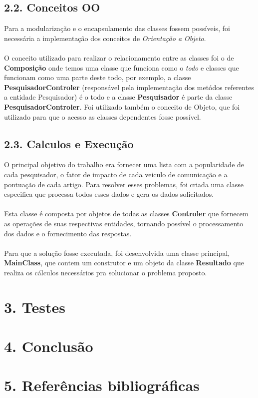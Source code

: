 \documentclass[12pt, a4paper]{article}
\begin{document}
  \subsection*{2.2. Conceitos OO}
    Para a modularização e o encapsulamento das classes fossem possíveis, foi necessária a implementação dos conceitos de \textit{Orientação a Objeto}.\\\\
    O conceito utilizado para realizar o relacionamento entre as classes foi o de \textbf{Composição} onde temos uma classe que funciona como o \textit{todo} e classes que funcionam como uma parte deste todo, por exemplo, a classe \textbf{PesquisadorControler} (responsável pela implementação dos metódos referentes a entidade Pesquisador) é o todo e a classe \textbf{Pesquisador} é parte da classe \textbf{PesquisadorControler}.
    Foi utilizado também o conceito de Objeto, que foi utilizado para que o acesso as classes dependentes fosse possível.

  \subsection*{2.3. Calculos e Execução}
    O principal objetivo do trabalho era fornecer uma lista com a popularidade de cada pesquisador, o fator de impacto de cada veiculo de comunicação e a pontuação de cada artigo. Para resolver esses problemas, foi criada uma classe especifica que processa todos esses dados e gera os dados solicitados.\\\\
    Esta classe é composta por objetos de todas as classes \textbf{Controler} que fornecem as operações de suas respectivas entidades, tornando possível o processamento dos dados e o fornecimento das respostas.\\\\
    Para que a solução fosse executada, foi desenvolvida uma classe principal, \textbf{MainClass}, que contem um construtor e um objeto da classe \textbf{Resultado} que realiza os cálculos necessários pra solucionar o problema proposto.


\section*{3. Testes}

\section*{4. Conclusão}


\section*{5. Referências bibliográficas}
\end{document}

